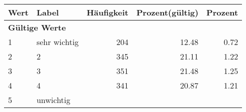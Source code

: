      \begin{longtable}{lXrrr}
     \toprule
     \textbf{Wert} & \textbf{Label} & \textbf{Häufigkeit} & \textbf{Prozent(gültig)} & \textbf{Prozent} \\
     \endhead
     \midrule
     \multicolumn{5}{l}{\textbf{Gültige Werte}}\\

     1 &
     \multicolumn{1}{X}{ sehr wichtig   } &


       \num{204} &
       \num[round-mode=places,round-precision=2]{12.48} &
         \num[round-mode=places,round-precision=2]{0.72} \\

     2 &
     \multicolumn{1}{X}{ 2   } &


       \num{345} &
       \num[round-mode=places,round-precision=2]{21.11} &
         \num[round-mode=places,round-precision=2]{1.22} \\

     3 &
     \multicolumn{1}{X}{ 3   } &


       \num{351} &
       \num[round-mode=places,round-precision=2]{21.48} &
         \num[round-mode=places,round-precision=2]{1.25} \\

     4 &
     \multicolumn{1}{X}{ 4   } &


       \num{341} &
       \num[round-mode=places,round-precision=2]{20.87} &
         \num[round-mode=places,round-precision=2]{1.21} \\

     5 &
     \multicolumn{1}{X}{ unwichtig   } &



\end{longtable}
